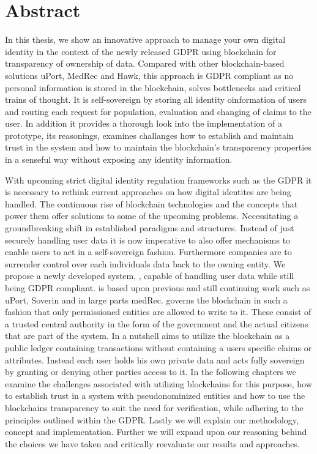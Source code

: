 \chapter*{Abstract}
\label{cha:abstract}

In this thesis, we show an innovative approach to manage your own digital identity in the context
of the newly released GDPR using blockchain for transparency of ownership of data.
Compared with other blockchain-based solutions uPort, MedRec and Hawk,
this approach is GDPR compliant as no personal information is stored in the blockchain, solves bottlenecks and critical
trains of thought.
It is self-sovereign by storing all identity oinformation of users and routing each request for population, evaluation and
changing of claims to the user.
In addition it provides a thorough look into the implementation of a prototype, its reasonings, examines challanges
how to establish and maintain trust in the system and how to maintain the blockchain's transparency properties in a
senseful way without exposing any identity information.

With upcoming strict digital identity regulation frameworks such as the GDPR\cite{gdpr} it is necessary to 
rethink current approaches on how digital identites are being handled. The continuous rise of blockchain technologies and the concepts that power them offer solutions to some of the upcoming problems. Necessitating a groundbreaking shift in established paradigms and structures.
Instead of just securely handling user data it is now imperative to also offer mechanisms to enable users to act in a self-sovereign fashion. Furthermore companies are to surrender control over each individuals data back to the owning entity. 
We propose a newly developed system, \projectName{}, capable of handling user data while still being GDPR compliant. \projectName{} is based upon previous and still continuing work such as uPort\cite{uPortWhitePaper}, Soverin\cite{} and in large parts medRec\cite{azaria2016medrec}.
\projectName{} governs the blockchain in such a fashion that only permissioned entities are allowed to write to it. These consist of a trusted central authority in the form of the government and the actual citizens that are part of the system. 
In a nutshell \projectName{} aims to utilize the blockchain as a public ledger containing transactions without containing a users specific claims or attributes. Instead each user holds his own private data and acts fully sovereign by granting or denying other parties access to it.
In the following chapters we examine the challenges associated with utilizing blockchains for this purpose, how to establish trust in a system with pseudonominized entities and how to use the blockchains transparency to suit the need for verification, while adhering to the principles outlined within the GDPR\cite{gdpr}.
Lastly we will explain our methodology, concept and implementation. Further we will expand upon our reasoning behind the choices we have taken and critically reevaluate our results and approaches. 